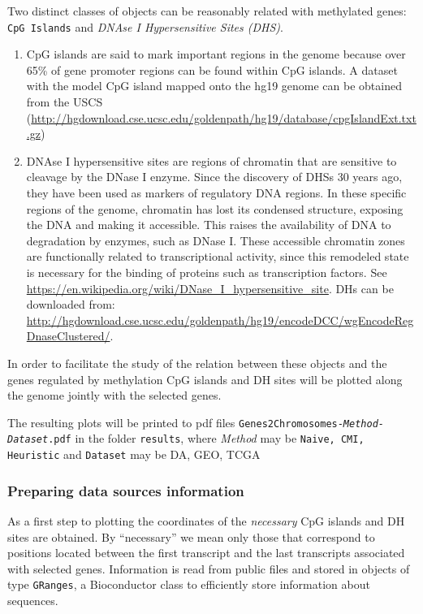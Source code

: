 \documentclass[a4paper,10pt]{article}\usepackage[]{graphicx}\usepackage[]{color}
\begin{document}
Two distinct classes of objects can be reasonably related with methylated genes: \texttt{CpG Islands} and \emph{DNAse I Hypersensitive Sites (DHS)}. 
\begin{enumerate}
\item CpG islands are said to mark important regions in the genome because over 65\% of gene promoter regions can be found within CpG islands. A dataset with the model CpG island mapped onto the hg19 genome can be obtained from the USCS (\url{http://hgdownload.cse.ucsc.edu/goldenpath/hg19/database/cpgIslandExt.txt.gz})
\item DNAse I hypersensitive sites are regions of chromatin that are sensitive to cleavage by the DNase I enzyme. Since the discovery of DHSs 30 years ago, they have been used as markers of regulatory DNA regions. In these specific regions of the genome, chromatin has lost its condensed structure, exposing the DNA and making it accessible. This raises the availability of DNA to degradation by enzymes, such as DNase I. These accessible chromatin zones are functionally related to transcriptional activity, since this remodeled state is necessary for the binding of proteins such as transcription factors. See \url{https://en.wikipedia.org/wiki/DNase_I_hypersensitive_site}. DHs can be downloaded from: \url{http://hgdownload.cse.ucsc.edu/goldenpath/hg19/encodeDCC/wgEncodeRegDnaseClustered/}.
\end{enumerate}

In order to facilitate the study of the relation between these objects and the genes regulated by methylation CpG islands and DH sites  will be plotted along the genome jointly with the selected genes.

The resulting plots will be printed to pdf files  \texttt{Genes2Chromosomes-\emph{Method-Dataset}.pdf} in the folder \texttt{results}, where \emph{Method} may be \texttt{Naive, CMI, Heuristic} and \texttt{Dataset} may be {DA, GEO, TCGA}

\subsubsection{Preparing data sources information}

As a first step to plotting the coordinates of the \emph{necessary} CpG islands and DH sites are obtained. By ``necessary'' we mean only those that correspond to positions located between the first transcript and the last transcripts associated with selected genes. Information is read from public files and stored in objects of type \texttt{GRanges}, a Bioconductor class to efficiently store information about sequences.
\end{document}
